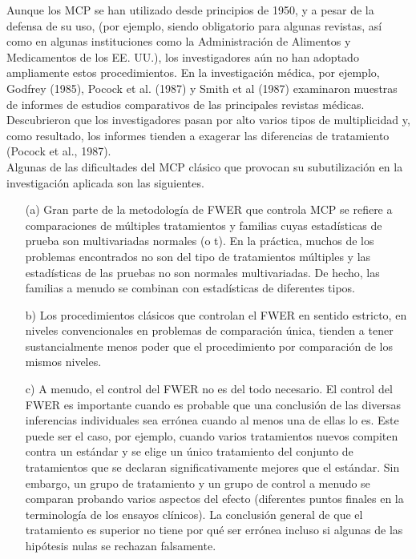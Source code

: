 \documentclass[11pt,letterpaper]{article}
\begin{document}
Aunque los MCP se han utilizado desde principios de 1950, y a pesar de la defensa de su uso, (por ejemplo, siendo obligatorio para algunas revistas, así como en algunas instituciones como la Administración de Alimentos y Medicamentos de los EE. UU.), los investigadores aún no han adoptado ampliamente estos procedimientos. En la investigación médica, por ejemplo, Godfrey (1985), Pocock et al. (1987) y Smith et al (1987) examinaron muestras de informes de estudios comparativos de las principales revistas médicas. Descubrieron que los investigadores pasan por alto varios tipos de multiplicidad y, como resultado, los informes tienden a exagerar las diferencias de tratamiento (Pocock et al., 1987).\\
Algunas de las dificultades del MCP clásico que provocan su subutilización en la investigación aplicada son las siguientes.
\begin{itemize}
\item[(a)] Gran parte de la metodología de FWER que controla MCP se refiere a comparaciones de múltiples tratamientos y familias cuyas estadísticas de prueba son multivariadas normales (o t). En la práctica, muchos de los problemas encontrados no son del tipo de tratamientos múltiples y las estadísticas de las pruebas no son normales multivariadas. De hecho, las familias a menudo se combinan con estadísticas de diferentes tipos.

\item[b)] Los procedimientos clásicos que controlan el FWER en sentido estricto, en niveles convencionales en problemas de comparación única, tienden a tener sustancialmente menos poder que el procedimiento por comparación de los mismos niveles.

\item[c)] A menudo, el control del FWER no es del todo necesario. El control del FWER es importante cuando es probable que una conclusión de las diversas inferencias individuales sea errónea cuando al menos una de ellas lo es. Este puede ser el caso, por ejemplo, cuando varios tratamientos nuevos compiten contra un estándar y se elige un único tratamiento del conjunto de tratamientos que se declaran significativamente mejores que el estándar. Sin embargo, un grupo de tratamiento y un grupo de control a menudo se comparan probando varios aspectos del efecto (diferentes puntos finales en la terminología de los ensayos clínicos). La conclusión general de que el tratamiento es superior no tiene por qué ser errónea incluso si algunas de las hipótesis nulas se rechazan falsamente.
\end{itemize}
\end{document}

